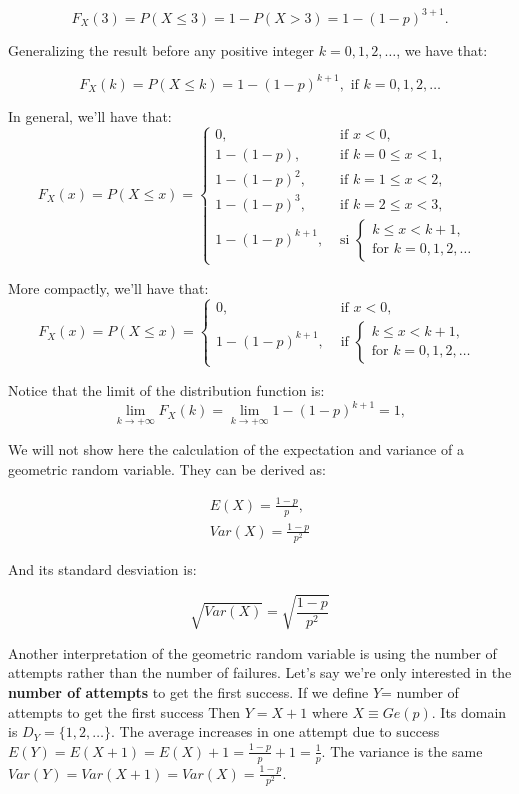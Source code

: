 \documentclass[
]{book}
\theoremstyle{definition}
\theoremstyle{definition}
\theoremstyle{definition}
\theoremstyle{definition}
\theoremstyle{remark}
\begin{document}
\[
F_X(3)=P(X\leq 3)=1-P(X>3)=1-(1-p)^{3+1}.
\]

Generalizing the result before any positive integer \(k=0,1,2,\ldots\), we have that:

\[
F_X(k)=P(X\leq k)=1-(1-p)^{k+1},\mbox{ if } k=0,1,2,\ldots
\]

In general, we'll have that:
\[
F_X(x)=P(X\leq x)=
\left\{\begin{array}{ll} 
0, & \mbox{ if } x<0,\\
1- (1-p),  & \mbox{ if } k=0\leq x <1,\\
1- (1-p)^2, & \mbox{ if } k=1\leq x <2,\\
1- (1-p)^3, & \mbox{ if } k=2\leq x <3,\\
1- (1-p)^{k+1}, & \mbox{ si } \left\{ \begin{array}{l}k\leq x< k+1,\\\mbox{for } k=0,1,2,\ldots\end{array}
    \right.\end{array}\right.
\]

More compactly, we'll have that:
\[
F_X(x)=P(X\leq x)=
\left\{\begin{array}{ll} 
0, & \mbox{ if } x<0,\\
1- (1-p)^{k+1}, & \mbox{ if } \left\{ \begin{array}{l}k\leq x< k+1,\\\mbox{for } k=0,1,2,\ldots\end{array}
    \right.\end{array}
    \right.
\]

Notice that the limit of the distribution function is:
\[
\displaystyle\lim_{k\to +\infty } F_X(k)=\lim_{k\to +\infty } 1-(1-p)^{k+1}=
1,
\]

We will not show here the calculation of the expectation and variance of a geometric random variable. They can be derived as:

\begin{align}
E(X)= \frac{1-p}{p}, \\
Var(X) =  \frac{1-p}{p^2}
\end{align}

And its standard desviation is:

\[
\sqrt{Var(X)}=\sqrt{\frac{1-p}{p^2}}
\]

Another interpretation of the geometric random variable is using the number of attempts rather than the number of failures. Let's say we're only interested in the \textbf{number of attempts} to get the first success. If we define \(Y\)= number of attempts to get the first success Then \(Y=X+1\) where \(X\equiv Ge(p)\). Its domain is \(D_Y=\{1,2,\ldots\}\). The average increases in one attempt due to success \(E(Y)=E(X+1)=E(X)+1=\frac{1-p}{p}+1=\frac1{p}\). The variance is the same \(Var(Y)=Var(X+1)=Var(X)=\frac{1-p}{p^2}\).
\end{document}
